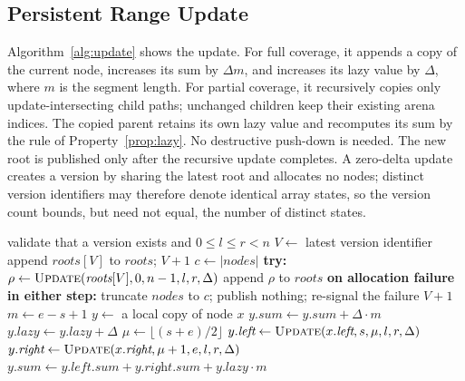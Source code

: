 \documentclass[conference]{IEEEtran}
\begin{document}
\subsection{Persistent Range Update}
\label{sec:update}

Algorithm~\ref{alg:update} shows the update. For full coverage, it appends a copy of the current
node, increases its sum by $\Delta m$, and increases its lazy value by $\Delta$, where $m$ is the
segment length. For partial coverage, it recursively copies only update-intersecting child paths;
unchanged children keep their existing arena indices. The copied parent retains its own lazy
value and recomputes its sum by the rule of Property~\ref{prop:lazy}. No destructive push-down is
needed. The new root is published only after the recursive update completes. A zero-delta update
creates a version by sharing the latest root and allocates no nodes; distinct version
identifiers may therefore denote identical array states, so the version count bounds, but need
not equal, the number of distinct states.

\begin{algorithm}[!t]
\caption{Persistent range-add update}
\label{alg:update}
\begin{algorithmic}[1]
  \State validate that a version exists and $0 \leq l \leq r < n$
  \State $V \gets$ latest version identifier
   
    \State append $\textit{roots}[V]$ to $\textit{roots}$; \Return $V+1$
  \EndIf
  \State $c \gets |\textit{nodes}|$ 
  \State \textbf{try:} $\rho \gets \Call{Update}{\textit{roots}[V], 0, n-1, l, r, \Delta}$
  \State \hspace{1.5em} append $\rho$ to $\textit{roots}$
  \State \textbf{on allocation failure in either step:} truncate $\textit{nodes}$ to $c$;
         publish nothing; re-signal the failure
  \State \Return $V+1$ 
\EndProcedure
\Statex
{} 
  \State $m \gets e - s + 1$
  \State $y \gets$ a local copy of node $x$
   
    \State $y.\textit{sum} \gets y.\textit{sum} + \Delta \cdot m$
    \State $y.\textit{lazy} \gets y.\textit{lazy} + \Delta$
    \State \Return {} 
  \EndIf
  \State $\mu \gets \lfloor (s+e)/2 \rfloor$ 
    \State $y.\textit{left} \gets \Call{Update}{x.\textit{left}, s, \mu, l, r, \Delta}$
  \EndIf
    \State $y.\textit{right} \gets \Call{Update}{x.\textit{right}, \mu+1, e, l, r, \Delta}$
  \EndIf
  \State $y.\textit{sum} \gets y.\textit{left}.\textit{sum} + y.\textit{right}.\textit{sum}
          + y.\textit{lazy} \cdot m$
  \State \Return {}
\EndFunction
\end{algorithmic}
\end{algorithm}
\end{document}
